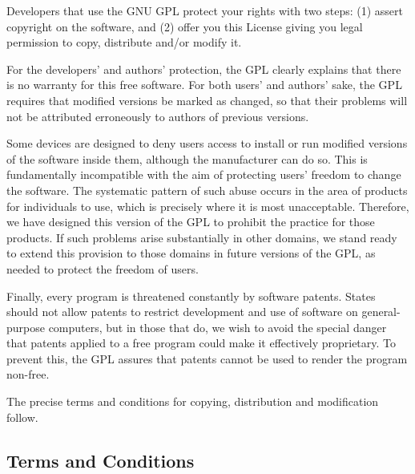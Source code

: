 \documentclass{article}
\begin{document}
Developers that use the GNU GPL protect your rights with two steps: (1) assert copyright on the software, and (2) offer you this License giving you legal permission to copy, distribute and/or modify it.

For the developers' and authors' protection, the GPL clearly explains that there is no warranty for this free software.  For both users' and authors' sake, the GPL requires that modified versions be marked as changed, so that their problems will not be attributed erroneously to authors of previous versions.

Some devices are designed to deny users access to install or run modified versions of the software inside them, although the manufacturer can do so.  This is fundamentally incompatible with the aim of protecting users' freedom to change the software.  The systematic pattern of such abuse occurs in the area of products for individuals to use, which is precisely where it is most unacceptable.  Therefore, we have designed this version of the GPL to prohibit the practice for those products.  If such problems arise substantially in other domains, we stand ready to extend this provision to those domains in future versions of the GPL, as needed to protect the freedom of users.

Finally, every program is threatened constantly by software patents. States should not allow patents to restrict development and use of software on general-purpose computers, but in those that do, we wish to avoid the special danger that patents applied to a free program could make it effectively proprietary.  To prevent this, the GPL assures that patents cannot be used to render the program non-free.

The precise terms and conditions for copying, distribution and modification follow.

\subsection{Terms and Conditions}
\end{document}
